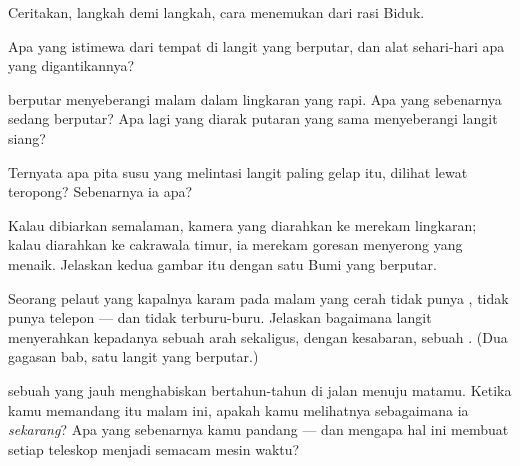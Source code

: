 \begin{exercise}[$\star$]\label{exo:g5:stars-night-sky:5}
Ceritakan, langkah demi langkah, cara menemukan  dari
rasi Biduk.
\end{exercise}

\begin{exercise}[$\star$]\label{exo:g5:stars-night-sky:6}
Apa yang istimewa dari tempat  di langit yang berputar,
dan alat sehari-hari apa yang digantikannya?
\end{exercise}

\begin{exercise}[$\star$]\label{exo:g5:stars-night-sky:7}
 berputar menyeberangi malam dalam lingkaran yang rapi. Apa
yang sebenarnya sedang berputar? Apa lagi yang diarak putaran yang
sama menyeberangi langit siang?
\end{exercise}

\begin{exercise}[$\star$]\label{exo:g5:stars-night-sky:8}
Ternyata apa pita susu yang melintasi langit paling gelap itu, dilihat
lewat teropong? Sebenarnya ia apa?
\end{exercise}

\begin{exercise}[$\star\star$]\label{exo:g5:stars-night-sky:9}
Kalau dibiarkan semalaman, kamera yang diarahkan ke 
merekam lingkaran; kalau diarahkan ke cakrawala timur, ia merekam
goresan menyerong yang menaik. Jelaskan kedua gambar itu dengan satu
Bumi yang berputar.
\end{exercise}

\begin{exercise}[$\star\star$]\label{exo:g5:stars-night-sky:10}
Seorang pelaut yang kapalnya karam pada malam yang cerah tidak punya
, tidak punya telepon --- dan tidak terburu-buru. Jelaskan
bagaimana langit menyerahkan kepadanya sebuah arah sekaligus, dengan
kesabaran, sebuah . (Dua gagasan bab, satu langit yang berputar.)
\end{exercise}

\begin{exercise}[$\star\star$]\label{exo:g5:stars-night-sky:11}
 sebuah  yang jauh menghabiskan bertahun-tahun di jalan
menuju matamu. Ketika kamu memandang  itu malam ini, apakah
kamu melihatnya sebagaimana ia \emph{sekarang}? Apa yang sebenarnya
kamu pandang --- dan mengapa hal ini membuat setiap teleskop menjadi
semacam mesin waktu?
\end{exercise}
